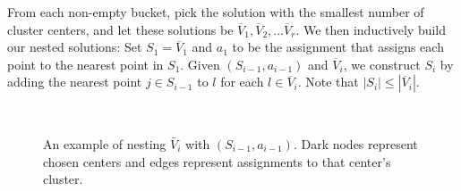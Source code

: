 \documentclass[conference, 10pt, final]{IEEEtran}
\begin{document}
From each non-empty bucket, pick the solution with the smallest number of cluster centers, and let these solutions be $\overline{V}_1, \overline{V}_2, \ldots \overline{V}_r$. We then inductively build our nested solutions: Set $S_1 = \overline{V}_1$ and $a_1$ to be the assignment that assigns each point to the nearest point in $S_1$. Given $(S_{i-1}, a_{i-1})$ and $\overline{V}_i$, we construct $S_i$ by  adding the nearest point $j \in S_{i-1}$ to $l$ for each $l \in \overline{V}_i$. Note that $|S_{i}| \leq |\overline{V}_i|$. 

\begin{figure}[!t]
\centering
{} \hspace{15mm}
 \\
  \hspace{15mm}
\caption{An example of nesting $\bar{V}_i$ with $(S_{i-1}, a_{i-1})$. Dark  nodes represent chosen centers and edges represent assignments to that center's cluster. }
\label{fig_sim}
\end{figure}
\end{document}
